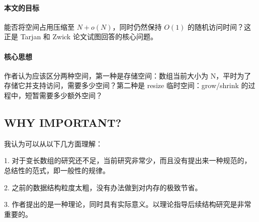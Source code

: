 \documentclass[12pt,a4paper]{article}
\begin{document}
\paragraph{本文的目标}

能否将空间占用压缩至 $N+o(N)$，同时仍然保持 $O(1)$ 的随机访问时间？这正是 Tarjan 和 Zwick 论文试图回答的核心问题\cite{tarjan2023optimalresizablearrays}。

\paragraph{核心思想}

作者认为应该区分两种空间，第一种是存储空间：数组当前大小为 N，平时为了存储它并支持访问，需要多少空间？第二种是 resize 临时空间：grow/shrink 的过程中，短暂需要多少额外空间？

\subsection{WHY IMPORTANT?}

我认为可以从以下几方面理解：

1. 对于变长数组的研究还不足，当前研究非常少，而且没有提出来一种规范的，总结性的范式，即一般性的规律。

2. 之前的数据结构粒度太粗，没有办法做到对内存的极致节省。

3. 作者提出的是一种理论，同时具有实际意义。以理论指导后续结构研究是非常重要的。

%
%
%
\end{document}
